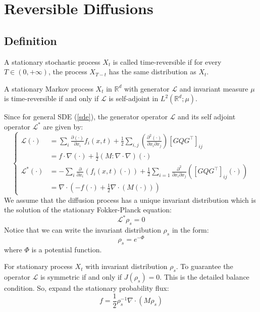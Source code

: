 \section{Reversible Diffusions}
\subsection{Definition}
\begin{definition}
    A stationary stochastic process $X_t$ is called time-reversible 
    if for every $T\in (0, +\infty)$, the process $X_{T-t}$ has the same distribution as $X_t$.
\end{definition}

\begin{theorem}
    A stationary Markov process $X_t$ in $\mathbb{R}^d$ with generator $\mathcal{L}$ and invariant measure $\mu$ is time-reversible 
    if and only if $\mathcal{L}$ is self-adjoint in $L^2(\mathbb{R}^d; \mu)$.
\end{theorem}

Since for general SDE (\ref{sde}), the generator operator $\mathcal{L}$ and its self adjoint operator $\mathcal{L}^*$ are given by:
\begin{equation}\left\{
\begin{aligned}
    \mathcal{L}(\cdot)&=\sum_{i} \frac{\partial(\cdot)}{\partial x_{i}} f_{i}(x, t)+\frac{1}{2} \sum_{i, j}\left(\frac{\partial^{2}(\cdot)}{\partial x_{i} \partial x_{j}}\right)\left[GQ G^{\top}\right]_{i j}\\
    &= f\cdot \nabla(\cdot) + \frac{1}{2} \left(M:\nabla\cdot \nabla\right)(\cdot)\\
    \mathcal{L}^*(\cdot)&=-\sum_{i} \frac{\partial}{\partial x_{i}}\left(f_{i}(x, t) (\cdot)\right)+\frac{1}{2} \sum_{i=1} \frac{\partial^{2}}{\partial x_{i} \partial x_{j}}\left(\left[G Q G^{\top}\right]_{i j}(\cdot)\right)\\
    & = \nabla\cdot (-f(\cdot)+\frac{1}{2}\nabla\cdot(M(\cdot)))
\end{aligned}\right.
\end{equation}
We assume that the diffusion process has a unique invariant distribution which is the solution of the stationary Fokker-Planck equation:
\begin{equation}
    \mathcal{L}^*\rho_s=0
\end{equation}
Notice that we can write the invariant distribution $\rho_s$ in the form:
\begin{equation}
    \rho_s = e^{-\Phi}
\end{equation}
where $\Phi$ is a potential function.
\begin{theorem}
    For stationary process $X_t$ with invariant distribution $\rho_s$.
    To guarantee the operator $\mathcal{L}$ is symmetric if and only if $J(\rho_s)=0$. This is the detailed balance condition.
    So, expand the stationary probability flux:
    \begin{equation}
        f = \frac{1}{2}\rho_s^{-1}\nabla\cdot\left(M\rho_s\right)
    \end{equation}
\end{theorem}

